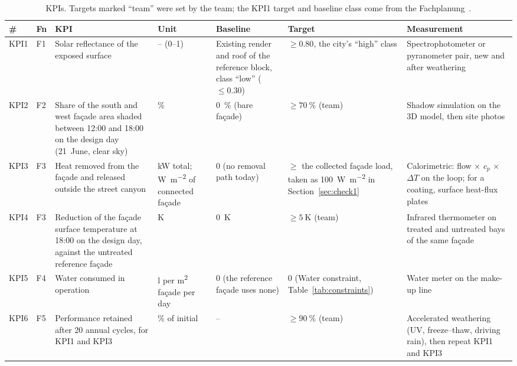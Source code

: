 \begin{table}[H]
\centering
\caption{KPIs. Targets marked \enquote{team} were set by the team; the KPI1
target and baseline class come from the Fachplanung~\cite[p.~128]{stadtzuerich2020}.}
\label{tab:kpi}
\renewcommand{\arraystretch}{1.0}
\scriptsize
\begin{tabularx}{\textwidth}{L{0.7cm} L{0.45cm} L{3.3cm} L{1.5cm} L{2.3cm} L{2.1cm} X}
\toprule
\textbf{\#} & \textbf{Fn} & \textbf{KPI} & \textbf{Unit} & \textbf{Baseline} &
\textbf{Target} & \textbf{Measurement} \\
\midrule
KPI1 & F1 & Solar reflectance of the exposed surface & -- (0--1) &
  Existing render and roof of the reference block, class \enquote{low}
  ($\leq 0.30$) &
  $\geq 0.80$, the city's \enquote{high} class &
  Spectrophotometer or pyranometer pair, new and after weathering \\
KPI2 & F2 & Share of the south and west façade area shaded between 12:00 and
  18:00 on the design day (21~June, clear sky) & \unit{\percent} &
  \qty{0}{\percent} (bare façade) &
  $\geq \qty{70}{\percent}$ (team) &
  Shadow simulation on the 3D model, then site photos \\
KPI3 & F3 & Heat removed from the façade and released outside the street canyon &
  \unit{\kilo\watt} total; \unit{\watt\per\square\metre} of connected façade &
  0 (no removal path today) &
  $\geq$ the collected façade load, taken as \qty{100}{\watt\per\square\metre}
  in Section~\ref{sec:check1} &
  Calorimetric: flow $\times$ $c_p$ $\times$ $\Delta T$ on the loop; for a
  coating, surface heat-flux plates \\
KPI4 & F3 & Reduction of the façade surface temperature at 18:00 on the design
  day, against the untreated reference façade & \unit{\kelvin} &
  \qty{0}{\kelvin} &
  $\geq \qty{5}{\kelvin}$ (team) &
  Infrared thermometer on treated and untreated bays of the same façade \\
KPI5 & F4 & Water consumed in operation & \unit{\litre} per \unit{\square\metre}
  façade per day &
  0 (the reference façade uses none) &
  0 (Water constraint, Table~\ref{tab:constraints}) &
  Water meter on the make-up line \\
KPI6 & F5 & Performance retained after 20 annual cycles, for KPI1 and KPI3 &
  \unit{\percent} of initial & -- &
  $\geq \qty{90}{\percent}$ (team) &
  Accelerated weathering (UV, freeze--thaw, driving rain), then repeat KPI1
  and KPI3 \\
\bottomrule
\end{tabularx}
\end{table}
